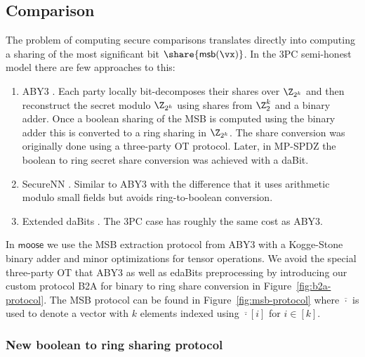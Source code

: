 \subsection{Comparison}


The problem of computing secure comparisons translates directly into computing a sharing of the most significant bit $\share{\mathsf{msb}(\vx)}$.
In the 3PC semi-honest model there are few approaches to this:
\begin{enumerate}
  \item ABY3 \cite{CCS:MohRin18}. Each party locally
   bit-decomposes their shares over $\Z_{2^k}$ and then reconstruct the secret
   modulo $\Z_{2^k}$ using shares from $\Z^k_2$ and a binary adder. Once a
   boolean sharing of the MSB is computed using the binary adder this is
   converted to a ring sharing in $\Z_{2^k}$.  The share conversion was
   originally done using a three-party OT protocol.  Later, in MP-SPDZ
   \cite{CCS:Keller20} the boolean to ring secret share conversion was achieved
   with a daBit.

  \item SecureNN \cite{PoPETS:WagGupCha19}.
   Similar to ABY3 with the difference that it uses arithmetic modulo
   small fields but avoids ring-to-boolean conversion.

  \item Extended daBits \cite{C:EGKRS20}. The 3PC case has roughly the same cost as ABY3.
\end{enumerate}

In $\mathsf{moose}$ we use the MSB extraction protocol from ABY3 with a Kogge-Stone binary adder and
minor optimizations for tensor operations. We avoid the special three-party OT
that ABY3 as well as edaBits preprocessing by introducing our custom
protocol \textsf{B2A} for binary to ring share conversion in
Figure~\ref{fig:b2a-protocol}.  The MSB protocol can be found in
Figure~\ref{fig:msb-protocol} where $\overline{\cdot}$ is used to denote a
vector with $k$ elements indexed using $\overline{\cdot}[i]$ for $i \in [k]$.




\subsubsection{New boolean to ring sharing protocol}

